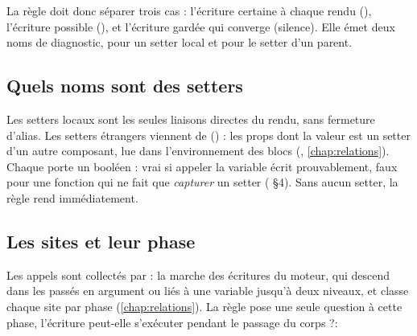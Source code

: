 La règle doit donc séparer trois cas : l'écriture certaine à chaque rendu (\Error), l'écriture possible (\Warning), et l'écriture gardée qui converge (silence). Elle émet deux noms de diagnostic,  pour un setter local et  pour le setter d'un parent.

\subsection{Quels noms sont des setters}


Les setters locaux sont les seules liaisons directes  du rendu, sans fermeture d'alias. Les setters étrangers viennent de  () : les props dont la valeur est un setter d'un autre composant, lue dans l'environnement des blocs (, \cref{chap:relations}). Chaque  porte un booléen  : vrai si appeler la variable écrit prouvablement, faux pour une fonction qui ne fait que \emph{capturer} un setter ( §4). Sans aucun setter, la règle rend immédiatement.

\subsection{Les sites et leur phase}

Les appels sont collectés par  : la marche des écritures du moteur, qui descend dans les  passés en argument ou liés à une variable jusqu'à deux niveaux, et classe chaque site par phase (\cref{chap:relations}). La règle pose une seule question à cette phase, \og l'écriture peut-elle s'exécuter pendant le passage du corps ?\fg :


